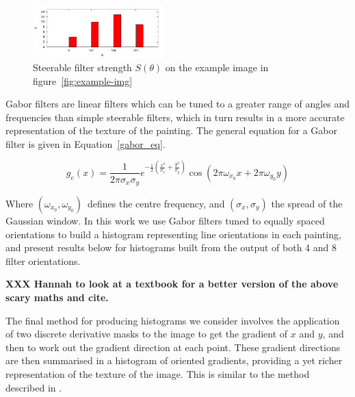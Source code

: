 \documentclass[conference,a4paper]{IEEEtran}
\begin{document}
\begin{figure}[h]
\centering
\includegraphics[width=0.45\textwidth]{img/steerable.pdf}
\caption{Steerable filter strength $S(\theta)$ on the example image in figure~\ref{fig:example-img}}
\end{figure}

Gabor filters are linear filters which can be tuned to a greater range of
angles and frequencies than simple steerable filters, which in turn results in
a more accurate representation of the texture of the painting. The general
equation for a Gabor filter is given in Equation~\ref{gabor_eq}.

\begin{equation}
g_e(x) = \frac{1}{2\pi\sigma_x \sigma_y}e^{-\frac{1}{2}\left(\frac{x^2}{\sigma_x}+\frac{y^2}{\sigma_y}\right)}\cos(2\pi\omega_{x_0}x + 2\pi\omega_{y_0}y)
\label{gabor_eq}
\end{equation}

Where $(\omega_{x_0},\omega_{y_0})$\ defines the centre frequency, and
$(\sigma_x,\sigma_y)$ the spread of the Gaussian window. In this work we use
Gabor filters tuned to equally spaced orientations to build a histogram
representing line orientations in each painting, and present results below for
histograms built from the output of both 4 and 8 filter orientations.

\textbf{XXX Hannah to look at a textbook for a better version of the above scary maths and cite.}


The final method for producing histograms we consider involves the application
of two discrete derivative masks to the image to get the gradient of $x$ and
$y$, and then to work out the gradient direction at each point. These gradient
directions are then summarised in a histogram of oriented gradients, providing
a yet richer representation of the texture of the image. This is similar to the
method described in \cite{Dalal2005Histograms}. 

\end{document}
